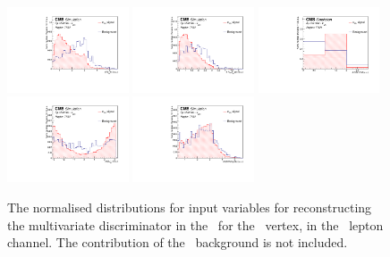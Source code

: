 \begin{figure}[htbp]
	\includegraphics[width=0.32\textwidth]{6_Search/Figures/PlotsTechnics/dRWlepbZuttoppairuuu_norm}
	\includegraphics[width=0.32\textwidth]{6_Search/Figures/PlotsTechnics/deltaRWlepJet_minZuttoppairuuu_norm}
		\includegraphics[width=0.32\textwidth]{6_Search/Figures/PlotsTechnics/NJets_CSVv2MZuttoppairuuu_norm}
	\includegraphics[width=0.32\textwidth]{6_Search/Figures/PlotsTechnics/dPhiZWlepZuttoppairuuu_norm}
	\includegraphics[width=0.32\textwidth]{6_Search/Figures/PlotsTechnics/dRSMjetLightjetZuttoppairuuu_norm}
	\caption{The normalised distributions for input variables for reconstructing the multivariate discriminator in the \TTSR\ for the \Zut\ vertex, in the \mumumu\ lepton channel. The contribution of the \NPL\ background is not included.}
	\label{fig:toppairZutnormalized}
\end{figure}

